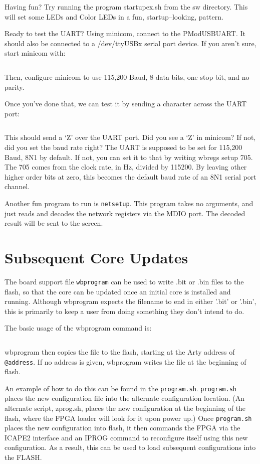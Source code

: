 \documentclass{gqtekspec}
\begin{document}
Having fun?  Try running the program startupex.sh from the sw directory.
This will set some LEDs and Color LEDs in a fun, startup--looking, pattern.

Ready to test the UART?   Using minicom, connect to the PModUSBUART.  It 
should also be connected to a /dev/ttyUSBx serial port device.  If you aren't
sure, start minicom with:
\begin{lstlisting}[language=bash]
% minicom -D /dev/ttyUSB2
\end{lstlisting}
Then, configure minicom to use 115,200 Baud, 8-data bits, one stop bit, and
no parity. 

Once you've done that, we can test it by sending a character across the UART
port:
\begin{lstlisting}[language=bash]
% wbregs tx 90
\end{lstlisting}
This should send a `Z' over the UART port.  Did you see a `Z' in minicom?
If not, did you set the baud rate right?  The UART is supposed to be set
for 115,200 Baud, 8N1 by default.  If not, you can set it to that by writing
wbregs setup 705.  The 705 comes from the clock rate, in Hz, divided by 
115200.  By leaving other higher order bits at zero, this becomes the default
baud rate of an 8N1 serial port channel.

Another fun program to run is {\tt netsetup}.  This program takes no arguments,
and just reads and decodes the network registers via the MDIO port.  The
decoded result will be sent to the screen.

\section{Subsequent Core Updates}
The board support file {\tt wbprogram} can be used to write .bit or .bin
files to the flash, so that the core can be updated once an initial core
is installed and running. 
Although wbprogram expects the filename to end in either '.bit' or '.bin',
this is primarily to keep a user from doing something they don't intend to
do.

The basic usage of the wbprogram command is:
\begin{lstlisting}[language=bash]
% wbprogram [@address] file
\end{lstlisting}
wbprogram then copies the file to the flash, starting at the Arty address
of {\tt @address}.  If no address is given, wbprogram writes the file at the 
beginning of flash.

An example of how to do this can be found in the {\tt program.sh}.
{\tt program.sh} places the new configuration file into the alternate
configuration location.  (An alternate script, zprog.sh, places the new
configuration at the beginning of the flash, where the FPGA loader will look
for it upon power up.)  Once {\tt program.sh} places the new configuration
into flash, it then commands the FPGA via the ICAPE2 interface and an IPROG
command to reconfigure itself using this new configuration.  As a result, this
can be used to load subsequent configurations into the FLASH.
\end{document}
